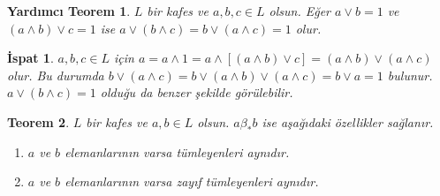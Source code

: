 \documentclass[a4paper,12pt]{article}
\numberwithin{equation}{section}
\theoremstyle{italik}
\newtheorem{teorem}{Teorem}[section]
\newtheorem{lemma}[teorem]{Yardımcı Teorem}
\newtheorem*{ispat}{İspat}
\begin{document}




\begin{lemma}\label{7}
  $ L $ bir kafes ve $ a,b,c \in L $ olsun. Eğer $ a \vee b=1 $ ve $ (a \wedge b) \vee c = 1 $ ise 
  $ a \vee ( b \wedge c ) =  b \vee (a \wedge c)=1 $ olur.
\end{lemma}
\begin{ispat}
  $ a,b,c \in L $ için $ a = a \wedge 1 = a \wedge \left[(a \wedge b) \vee c \right] = 
  (a \wedge b) \vee (a \wedge c)$ olur. Bu durumda $ b \vee (a \wedge c) = b \vee (a \wedge b) \vee (a \wedge c) = b \vee a = 1 $ 
  bulunur. $ a \vee (b \wedge c)=1 $ olduğu da benzer şekilde görülebilir.
\end{ispat}





\begin{teorem} \label{8} \autocite[Theorem 2.6]{nebiyev}
    $ L $ bir kafes ve $ a,b \in L $ olsun. $ a \beta_* b $ ise aşağıdaki özellikler sağlanır.
    \begin{enumerate}[label=(\roman{*}), ref=(\roman{*})]
      \item $ a $ ve $ b $ elemanlarının varsa tümleyenleri aynıdır. \label{8.1}
      \item $ a $ ve $ b $ elemanlarının varsa zayıf tümleyenleri aynıdır.\label{8.2}
    \end{enumerate}
\end{teorem}
\end{document}
